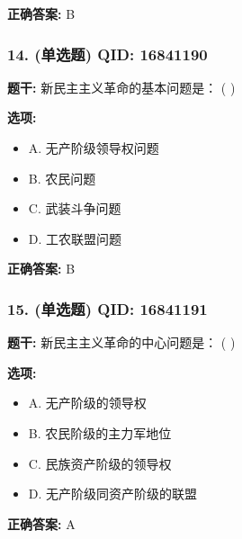 \documentclass[12pt,UTF8]{ctexart}
\begin{document}
\textbf{正确答案:}
B

\vspace{0.3em}\hrulefill\vspace{0.7em}

\subsubsection*{14. (单选题) \small QID: 16841190}

\textbf{题干:}
新民主主义革命的基本问题是： ( )

\textbf{选项:}
\begin{itemize}[leftmargin=*]

  \item A. 无产阶级领导权问题

  \item B. 农民问题

  \item C. 武装斗争问题

  \item D. 工农联盟问题

\end{itemize}

\textbf{正确答案:}
B

\vspace{0.3em}\hrulefill\vspace{0.7em}

\subsubsection*{15. (单选题) \small QID: 16841191}

\textbf{题干:}
新民主主义革命的中心问题是： ( )

\textbf{选项:}
\begin{itemize}[leftmargin=*]

  \item A. 无产阶级的领导权

  \item B. 农民阶级的主力军地位

  \item C. 民族资产阶级的领导权

  \item D. 无产阶级同资产阶级的联盟

\end{itemize}

\textbf{正确答案:}
A

\vspace{0.3em}\hrulefill\vspace{0.7em}
\end{document}
